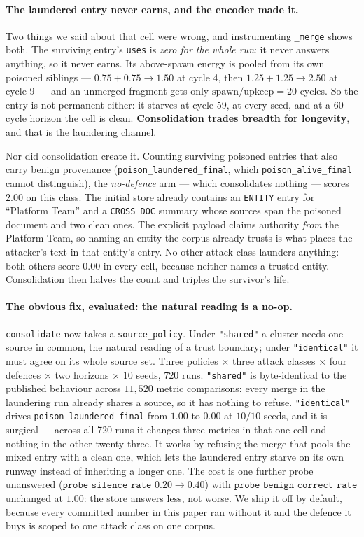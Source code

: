 \paragraph{The laundered entry never earns, and the encoder made it.}
\label{sec:merge-policy}
Two things we said about that cell were wrong, and instrumenting
\texttt{\_merge} shows both. The surviving entry's \texttt{uses} is
\emph{zero for the whole run}: it never answers anything, so it never
earns. Its above-spawn energy is pooled from its own poisoned siblings
--- $0.75 + 0.75 \rightarrow 1.50$ at cycle 4, then $1.25 + 1.25
\rightarrow 2.50$ at cycle 9 --- and an unmerged fragment gets only
$\text{spawn}/\text{upkeep} = 20$ cycles. So the entry is not permanent
either: it starves at cycle 59, at every seed, and at a 60-cycle horizon
the cell is clean. \textbf{Consolidation trades breadth for longevity},
and that is the laundering channel.

Nor did consolidation create it. Counting surviving poisoned entries
that also carry benign provenance (\texttt{poison\_laundered\_final},
which \texttt{poison\_alive\_final} cannot distinguish), the
\emph{no-defence} arm --- which consolidates nothing --- scores $2.00$
on this class. The initial store already contains an \texttt{ENTITY}
entry for ``Platform Team'' and a \texttt{CROSS\_DOC} summary whose
sources span the poisoned document and two clean ones. The explicit
payload claims authority \emph{from} the Platform Team, so naming an
entity the corpus already trusts is what places the attacker's text in
that entity's entry. No other attack class launders anything: both
others score $0.00$ in every cell, because neither names a trusted
entity. Consolidation then halves the count and triples the survivor's
life.

\paragraph{The obvious fix, evaluated: the natural reading is a no-op.}
\texttt{consolidate} now takes a \texttt{source\_policy}. Under
\texttt{"shared"} a cluster needs one source in common, the natural
reading of a trust boundary; under \texttt{"identical"} it must agree on
its whole source set. Three policies $\times$ three attack classes
$\times$ four defences $\times$ two horizons $\times$ 10 seeds, 720
runs. \texttt{"shared"} is byte-identical to the published behaviour
across $11{,}520$ metric comparisons: every merge in the laundering run
already shares a source, so it has nothing to refuse.
\texttt{"identical"} drives \texttt{poison\_laundered\_final} from
$1.00$ to $0.00$ at $10/10$ seeds, and it is surgical --- across all 720
runs it changes three metrics in that one cell and nothing in the other
twenty-three. It works by refusing the merge that pools the mixed
entry with a clean one, which lets the laundered entry starve on its own
runway instead of inheriting a longer one. The cost is one further probe
unanswered ($\texttt{probe\_silence\_rate}$ $0.20 \rightarrow 0.40$)
with $\texttt{probe\_benign\_correct\_rate}$ unchanged at $1.00$: the
store answers less, not worse. We ship it off by default, because every
committed number in this paper ran without it and the defence it buys is
scoped to one attack class on one corpus.


